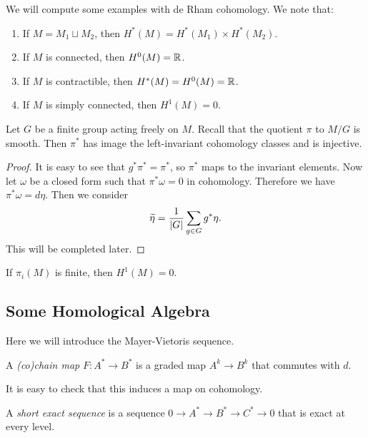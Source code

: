 \documentclass[twoside, 10pt]{article}
\begin{document}
    We will compute some examples with de Rham cohomology. We note that:
    \begin{enumerate}
        \item If $M = M_1 \sqcup M_2$, then $H^*(M) = H^*(M_1) \times H^*(M_2)$.
        \item If $M$ is connected, then $H^0(M) = \mathbb{R}$.
        \item If $M$ is contractible, then $H^*(M) = H^0(M) = \mathbb{R}$.
        \item If $M$ is simply connected, then $H^1(M) = 0$.
    \end{enumerate}

    \begin{thm}
        Let $G$ be a finite group acting freely on $M$. Recall that the quotient $\pi$ to $M/G$ is smooth. Then $\pi^*$ has image the left-invariant cohomology classes and is injective.
    \end{thm}

    \begin{proof}
        It is easy to see that $g^*\pi^* = \pi^*$, so $\pi^*$ maps to the invariant elements. Now let $\omega$ be a closed form such that $\pi^*\omega = 0$ in cohomology. Therefore we have $\pi^*\omega = d\eta$. Then we consider 
        \[\widetilde{\eta} = \frac{1}{\lvert G\rvert} \sum_{g \in G}g^*\eta. \]
        This will be completed later.
    \end{proof}

    \begin{cor}
        If $\pi_i(M)$ is finite, then $H^1(M) = 0$.
    \end{cor}

    \subsection{Some Homological Algebra}%
    \label{sub:some_homological_algebra}
    
    Here we will introduce the Mayer-Vietoris sequence.

    \begin{defn}
        A \textit{(co)chain map} $F:A^* \to B^*$ is a graded map $A^k \to B^k$ that commutes with $d$.
    \end{defn}

    It is easy to check that this induces a map on cohomology.

    \begin{defn}
        A \textit{short exact sequence} is a sequence $0 \to A^* \to B^* \to C^* \to 0$ that is exact at every level.
    \end{defn}
\end{document}
